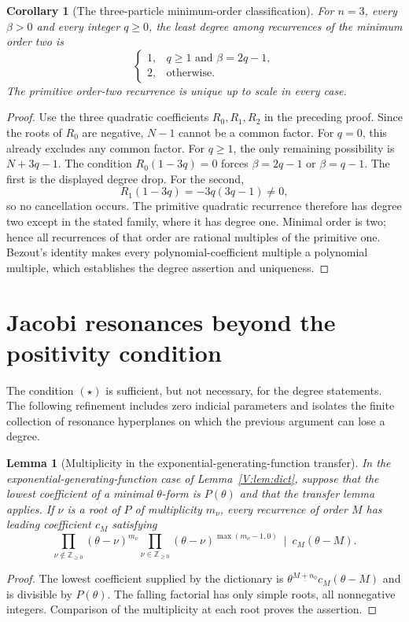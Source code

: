 \documentclass[11pt,a4paper]{article}
\newtheorem{lemma}[theorem]{Lemma}
\newtheorem{corollary}[theorem]{Corollary}
\theoremstyle{definition}
\theoremstyle{remark}
\newcommand{\ff}[2]{#1^{\underline{#2}}}
\numberwithin{equation}{section}
\begin{document}
\begin{corollary}[The three-particle minimum-order classification]
\label{vtd:three-particle-classification}
For $n=3$, every $\beta>0$ and every integer $q\ge0$, the least
degree among recurrences of the minimum order two is
\[
 \begin{cases}
  1,&q\ge1\text{ and }\beta=2q-1,\\
  2,&\text{otherwise}.
 \end{cases}
\]
The primitive order-two recurrence is unique up to scale in every case.
\end{corollary}
\begin{proof}
Use the three quadratic coefficients $R_0,R_1,R_2$ in the preceding
proof.  Since the roots of $R_0$ are negative, $N-1$ cannot be a
common factor.  For $q=0$, this already excludes any common factor.
For $q\ge1$, the only remaining possibility is $N+3q-1$.
The condition $R_0(1-3q)=0$ forces
$\beta=2q-1$ or $\beta=q-1$.  The first is the displayed degree
drop.  For the second,
\[
              R_1(1-3q)=-3q(3q-1)\ne0,
\]
so no cancellation occurs.  The primitive quadratic recurrence
therefore has degree two except in the stated family, where it has
degree one.  Minimal order is two; hence all recurrences of that order
are rational multiples of the primitive one.  Bezout's identity makes
every polynomial-coefficient multiple a polynomial multiple, which
establishes the degree assertion and uniqueness.
\end{proof}

\section{Jacobi resonances beyond the positivity condition}
\label{V:sec:jacobi-resonances}
The condition $(\star)$ is sufficient, but not necessary, for the degree
statements. The following refinement includes zero indicial parameters and
isolates the finite collection of resonance hyperplanes on which the previous
argument can lose a degree.

\begin{lemma}[Multiplicity in the exponential-generating-function transfer]
\label{V:lem:egf-multiplicity}
In the exponential-generating-function case of Lemma~\ref{V:lem:dict}, suppose
that the lowest coefficient of a minimal $\theta$-form is $P(\theta)$ and
that the transfer lemma applies. If $\nu$ is a root of $P$ of multiplicity
$m_\nu$, every recurrence of order $M$ has leading coefficient $c_M$ satisfying
\[
 \prod_{\nu\notin\mathbb Z_{\ge0}}(\theta-\nu)^{m_\nu}
 \prod_{\nu\in\mathbb Z_{\ge0}}(\theta-\nu)^{\max(m_\nu-1,0)}
 \ \mid\ c_M(\theta-M).
\]
\end{lemma}
\begin{proof}
The lowest coefficient supplied by the dictionary is
$\ff\theta{M+n_0}c_M(\theta-M)$ and is divisible by $P(\theta)$.
The falling factorial has only simple roots, all nonnegative integers.
Comparison of the multiplicity at each root proves the assertion.
\end{proof}
\end{document}
